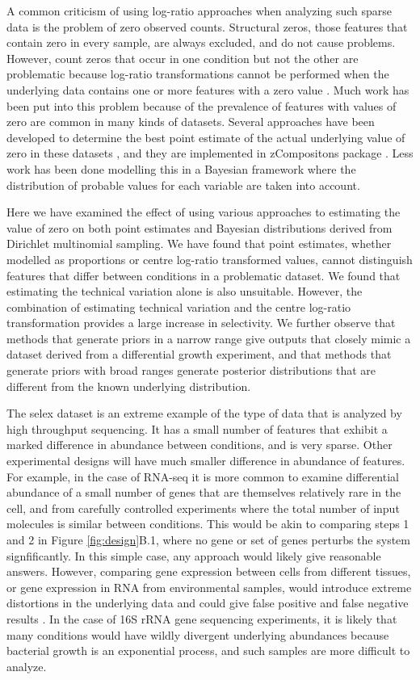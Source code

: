 \documentclass[article]{ajs}\usepackage[]{graphicx}\usepackage[]{color}
\begin{document}
A common criticism of using log-ratio approaches when analyzing such sparse data is the problem of zero observed counts. Structural zeros, those features that contain zero in every sample, are always excluded, and do not cause problems. However, count zeros that occur in one condition but not the other are problematic because log-ratio transformations cannot be performed when the underlying data contains one or more features with a zero value \citep{Aitchison:1986}. Much work has been put into this problem because of the prevalence of features with values of zero are common in many kinds of datasets. Several approaches have been developed to determine the best point estimate of the actual underlying value of zero in these datasets \citep{pawlowsky2015modeling}, and they are implemented in zCompositons  package \citep{PalareaAlbaladejo201585}. Less work has been done modelling this in a Bayesian framework where the distribution of probable values for each variable are taken into account. 

Here we have examined the effect of using various approaches to estimating the value of zero on both point estimates and Bayesian distributions derived from Dirichlet multinomial sampling. We have found that point estimates, whether modelled as proportions or centre log-ratio transformed values,  cannot distinguish features that differ between conditions in a problematic dataset. We found that estimating the technical variation alone is also unsuitable. However, the combination of estimating technical variation and the centre log-ratio transformation provides a large increase in selectivity. We further observe that methods that  generate priors in a narrow range give outputs that closely mimic a dataset derived from a differential growth experiment, and that methods that generate priors with broad ranges generate posterior distributions that are different from the known underlying distribution.

The selex dataset is an extreme example of the type of data that is  analyzed by high throughput sequencing. It has a small number of features that exhibit a marked difference in abundance between conditions, and is very sparse. Other experimental designs will have much smaller difference in abundance of features. For example, in the case of  RNA-seq it is more common to examine differential abundance of a small number of genes that are themselves relatively rare in the cell, and from carefully controlled experiments where the total number of input molecules is similar between conditions. This would be akin to comparing steps 1 and 2 in Figure \ref{fig:design}B.1, where no gene or set of genes perturbs the system signfificantly. In this simple case, any approach would likely give reasonable answers. However, comparing gene expression between cells from different tissues, or gene expression in RNA from environmental samples, would introduce  extreme distortions in the underlying data and could give false positive and false negative results \citep{fernandes:2013,macklaim:2013,fernandes:2014}. In the case of 16S rRNA gene sequencing experiments, it is likely that many conditions would have wildly divergent underlying abundances because bacterial growth is an exponential process, and such samples are more difficult to analyze. 
\end{document}

